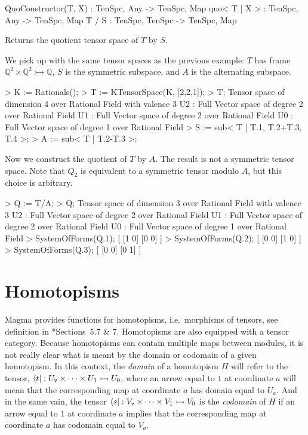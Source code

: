\begin{intrinsics}
QuoConstructor(T, X) : TenSpc, Any -> TenSpc, Map
quo< T | X > : TenSpc, Any -> TenSpc, Map
T / S : TenSpc, TenSpc -> TenSpc, Map
\end{intrinsics}

Returns the quotient tensor space of $T$ by $S$.

\begin{example}[QuotientTensorSpaces]

We pick up with the same tensor spaces as the previous example: $T$ has frame
$\mathbb{Q}^2\times\mathbb{Q}^2\rightarrowtail \mathbb{Q}$, $S$ is the symmetric
subspace, and $A$ is the alternating subspace.
\begin{code}
> K := Rationals();
> T := KTensorSpace(K, [2,2,1]);
> T;
Tensor space of dimension 4 over Rational Field with valence 3
U2 : Full Vector space of degree 2 over Rational Field
U1 : Full Vector space of degree 2 over Rational Field
U0 : Full Vector space of degree 1 over Rational Field
> S := sub< T | T.1, T.2+T.3, T.4 >;
> A := sub< T | T.2-T.3 >;
\end{code}

Now we construct the quotient of $T$ by $A$. The result is not a symmetric
tensor space. Note that $Q_2$ is equivalent to a symmetric tensor modulo $A$,
but this choice is arbitrary.
\begin{code}
> Q := T/A;
> Q;
Tensor space of dimension 3 over Rational Field with valence 3
U2 : Full Vector space of degree 2 over Rational Field
U1 : Full Vector space of degree 2 over Rational Field
U0 : Full Vector space of degree 1 over Rational Field
> SystemOfForms(Q.1);
[
    [1 0]
    [0 0]
]
> SystemOfForms(Q.2);
[
    [0 0]
    [1 0]
]
> SystemOfForms(Q.3);
[
    [0 0]
    [0 1]
]
\end{code}
\end{example}

\section{Homotopisms}

Magma provides functions for homotopisms, i.e.\ morphisms of tensors,
see definition in \cite{FMW:densors}*{Sections~5.7 \& 7}.
Homotopisms are also equipped with a tensor category. Because homotopisms can
contain multiple maps between modules, it is not really clear what is meant by
the domain or codomain of a given homotopism. In this context, the \emph{domain}
of a homotopism $H$ will refer to the tensor, $\langle t|:U_{\operatorname{\mathtt{v}}}\times \cdots \times
U_1\rightarrowtail U_0$, where an arrow equal to $1$ at coordinate $a$ will mean
that the corresponding map at coordinate $a$ has domain equal to $U_a$. And in
the same vain, the tensor $\langle s|:V_{\operatorname{\mathtt{v}}} \times\cdots \times V_1\rightarrowtail
V_0$ is the \emph{codomain} of $H$ if an arrow equal to $1$ at coordinate $a$
implies that the corresponding map at coordinate $a$ has codomain equal to
$V_a$. 

